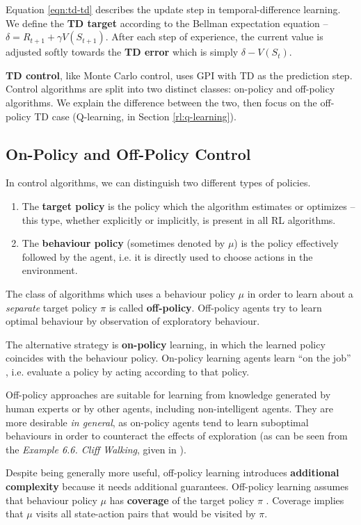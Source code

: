 Equation \ref{eqn:td-td} describes the update step in temporal-difference learning.
We define the \textbf{TD target} according to the Bellman expectation equation -- $\delta = R_{t+1} + \gamma V(S_{t+1})$.
After each step of experience, the current value is adjusted softly towards the \textbf{TD error} which is simply $\delta - V(S_t)$.

\textbf{TD control}, like Monte Carlo control, uses GPI with TD as the prediction step.
Control algorithms are split into two distinct classes: on-policy and off-policy algorithms.
We explain the difference between the two, then focus on the off-policy TD case (Q-learning, in Section \ref{rl:q-learning}).

\subsection{On-Policy and Off-Policy Control}
In control algorithms, we can distinguish two different types of policies.
\begin{enumerate}
    \item The \textbf{target policy} is the policy which the algorithm estimates or optimizes -- this type, whether explicitly or implicitly, is present in all RL algorithms.
    \item The \textbf{behaviour policy} (sometimes denoted by $\mu$) is the policy effectively followed by the agent, i.e. it is directly used to choose actions in the environment.
\end{enumerate}

The class of algorithms which uses a behaviour policy $\mu$ in order to learn about a \emph{separate} target policy $\pi$ is called \textbf{off-policy}.
Off-policy agents try to learn optimal behaviour by observation of exploratory behaviour.

The alternative strategy is \textbf{on-policy} learning, in which the learned policy coincides with the behaviour policy.
On-policy learning agents learn ``on the job'' \cite{silver-lectures}, i.e. evaluate a policy by acting according to that policy.

Off-policy approaches are suitable for learning from knowledge generated by human experts or by other agents, including non-intelligent agents.
They are more desirable \emph{in general}, as on-policy agents tend to learn suboptimal behaviours in order to counteract the effects of exploration (as can be seen from the \emph{Example 6.6. Cliff Walking}, given in \cite{rlai}).

Despite being generally more useful, off-policy learning introduces \textbf{additional complexity} because it needs additional guarantees.
Off-policy learning assumes that behaviour policy $\mu$ has \textbf{coverage} of the target policy $\pi$ \cite{rlai}.
Coverage implies that $\mu$ visits all state-action pairs that would be visited by $\pi$.

